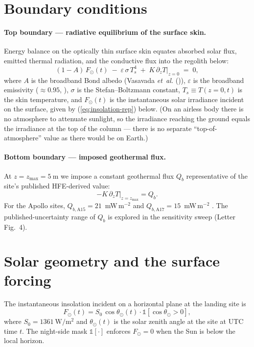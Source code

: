 \documentclass[11pt]{report}
\newcommand{\Vas}{Vasavada \emph{et~al.} (\citeyear{vasavada2012})}
\begin{document}
\section{Boundary conditions}

\paragraph{Top boundary --- radiative equilibrium of the surface skin.}
Energy balance on the optically thin surface skin equates absorbed
solar flux, emitted thermal radiation, and the conductive flux into
the regolith below:
\begin{equation}
(1-A)\,F_\odot(t)\;-\;\varepsilon\,\sigma\,T_s^4\;+\;
K\,\partial_z T\big|_{z=0} \;=\; 0,
\label{eq:bc-top-rep}
\end{equation}
where $A$ is the broadband Bond albedo (\Vas), $\varepsilon$ is the
broadband emissivity ($\approx 0.95$, \citealt{bandfield2015}),
$\sigma$ is the Stefan--Boltzmann constant, $T_s\equiv T(z=0,t)$ is
the skin temperature, and $F_\odot(t)$ is the instantaneous solar
irradiance incident on the surface, given by
(\ref{eq:insolation-rep}) below. (On an airless body there is no
atmosphere to attenuate sunlight, so the irradiance reaching the
ground equals the irradiance at the top of the column --- there is
no separate ``top-of-atmosphere'' value as there would be on
Earth.)

\paragraph{Bottom boundary --- imposed geothermal flux.}
At $z=z_\mathrm{max}=\SI{5}{\meter}$ we impose a constant geothermal
flux $Q_b$ representative of the site's published HFE-derived value:
\begin{equation}
-K\,\partial_z T\Big|_{z=z_\mathrm{max}} = Q_b.
\label{eq:bc-bot-rep}
\end{equation}
For the Apollo sites, $Q_{b,\mathrm{A15}} = 21$~mW\,m$^{-2}$
\citep{langseth1976} and $Q_{b,\mathrm{A17}} = 15$~mW\,m$^{-2}$
\citep{nagihara2018}. The published-uncertainty range of $Q_b$ is
explored in the sensitivity sweep (Letter Fig.~4).

\section{Solar geometry and the surface forcing}\label{sec:lst}

The instantaneous insolation incident on a horizontal plane at the
landing site is
\begin{equation}
F_\odot(t) = S_0\,\cos\theta_\odot(t)\cdot\mathbb{1}[\cos\theta_\odot>0],
\label{eq:insolation-rep}
\end{equation}
where $S_0=\SI{1361}{\watt\per\meter\squared}$ \citep{kopp2011} and
$\theta_\odot(t)$ is the solar zenith angle at the site at UTC time
$t$. The night-side mask $\mathbb{1}[\cdot]$ enforces $F_\odot=0$
when the Sun is below the local horizon.
\end{document}
